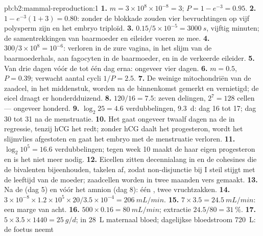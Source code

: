 \begin{solution}{pb:b2:mammal-reproduction:1}
\textbf{1.} $m = 3\times 10^{8}\times 10^{-8} = 3$; $P = 1 - e^{-3} =
0.95$.
\textbf{2.} $1 - e^{-3}(1 + 3) = 0.80$: zonder de blokkade zouden vier
bevruchtingen op vijf polysperm zijn en het embryo triploïd.
\textbf{3.} $0.15/5\times 10^{-5} = \qty{3000}{s}$, vijftig minuten;
de samentrekkingen van baarmoeder en eileider voeren ze mee.
\textbf{4.} $300/3\times 10^{8} = 10^{-6}$: verloren in de zure vagina, in
het slijm van de baarmoederhals, aan fagocyten in de baarmoeder, en in de
verkeerde eileider.
\textbf{5.} Van drie dagen vóór de  tot één dag erna: ongeveer
vier dagen.
\textbf{6.} $m = 0.5$, $P = 0.39$; verwacht aantal cycli $1/P = 2.5$.
\textbf{7.} De weinige mitochondriën van de zaadcel, in het middenstuk,
worden na de binnenkomst gemerkt en vernietigd; de eicel draagt er
honderdduizend.
\textbf{8.} $120/16 = 7.5$: zeven delingen, $2^{7} = 128$ cellen ---
ongeveer honderd.
\textbf{9.} $\log_2 25 = 4.6$ verdubbelingen, \qty{9.3}{d}: dag 16 tot 17;
dag 30 tot 31 na de menstruatie.
\textbf{10.} Het  gaat ongeveer twaalf dagen na de  in
regressie, tenzij hCG het redt; zonder hCG daalt het progesteron, wordt
het slijmvlies afgestoten en gaat het embryo met de menstruatie verloren.
\textbf{11.} $\log_2 10^{5} = 16.6$ verdubbelingen; tegen week 10 maakt de
 haar eigen progesteron en is het  niet meer nodig.
\textbf{12.} Eicellen zitten decennialang in  en de cohesines die
de bivalenten bijeenhouden, takelen af, zodat non-disjunctie bij  I
steil stijgt met de leeftijd van de moeder; zaadcellen worden in twee
maanden vers gemaakt.
\textbf{13.} Na de  (dag 5) en vóór het amnion (dag
8): één , twee vruchtzakken.
\textbf{14.} $3\times 10^{-8}\times 1.2\times 10^{5}\times 20/3.5\times
10^{-4} = \qty{206}{mL/min}$.
\textbf{15.} $7\times 3.5 = \qty{24.5}{mL/min}$: een marge van acht.
\textbf{16.} $500\times 0.16 = \qty{80}{mL/min}$; extractie
$24.5/80 = \qty{31}{\%}$.
\textbf{17.} $5\times 3.5\times 1440 = \qty{25}{g/d}$; in \qty{28}{L}
maternaal bloed; dagelijkse bloedstroom \qty{720}{L}: de foetus neemt

\end{solution}
